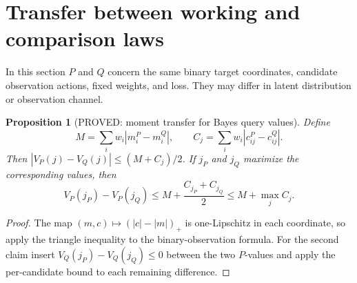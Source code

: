 \documentclass[11pt]{article}
\newtheorem{proposition}[theorem]{Proposition}
\theoremstyle{definition}
\theoremstyle{remark}
\begin{document}
\section{Transfer between working and comparison laws}

In this section $P$ and $Q$ concern the same binary target coordinates,
candidate observation actions, fixed weights, and loss. They may differ
in latent distribution or observation channel.

\begin{proposition}[PROVED: moment transfer for Bayes query values]
\label{prop:moment-transfer-r3}
Define
\[
 M=\sum_i w_i|m_i^P-m_i^Q|,
 \qquad C_j=\sum_i w_i|c_{ij}^P-c_{ij}^Q|.
\]
Then
$|V_P(j)-V_Q(j)|\le(M+C_j)/2$.
If $j_P$ and $j_Q$ maximize the corresponding values, then
\[
 V_P(j_P)-V_P(j_Q)
 \le M+\frac{C_{j_P}+C_{j_Q}}{2}
 \le M+\max_j C_j.
\]
\end{proposition}
\begin{proof}
The map $(m,c)\mapsto(|c|-|m|)_+$ is one-Lipschitz in each coordinate,
so apply the triangle inequality to the binary-observation formula.
For the second claim insert
$V_Q(j_P)-V_Q(j_Q)\le0$ between the two $P$-values and apply the
per-candidate bound to each remaining difference.
\end{proof}
\end{document}

